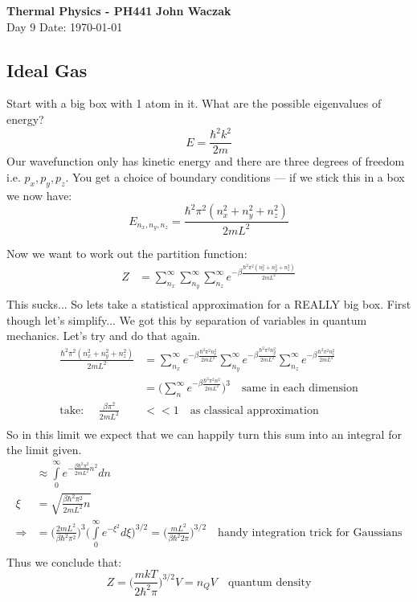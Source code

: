 \documentclass[a4paper, 11pt]{article}
\begin{document}
\noindent
\large\textbf{Thermal Physics - PH441} \hfill \textbf{John Waczak} \\
\normalsize Day 9 \hfill  Date: \today \\

\subsection*{Ideal Gas}
Start with a big box with 1 atom in it. What are the possible eigenvalues of energy? 
	\begin{equation*}
		E = \frac{\hbar^2k^2}{2m} 
	\end{equation*}
Our wavefunction only has kinetic energy and there are three degrees of freedom i.e. $p_x, p_y, p_z$. You get a choice of boundary conditions --- if we stick this in a box we now have: 
	\begin{equation*}
		E_{n_x, n_y,n_z} = \frac{\hbar^2\pi^2(n_x^2+n_y^2+n_z^2)}{2mL^2}
	\end{equation*}

\noindent Now we want to work out the partition function: 
	\begin{align*}
		Z &= \sum\limits_{n_x}^\infty \sum\limits_{n_y}^\infty \sum\limits_{n_z}^\infty e^{-\beta\frac{\hbar^2\pi^2(n_x^2+n_y^2+n_z^2)}{2mL^2}} \\ 
	\end{align*}
This sucks... So lets take a statistical approximation for a REALLY big box. First though let's simplify... We got this by separation of variables in quantum mechanics. Let's try and do that again. 
	\begin{align*}
		\frac{\hbar^2\pi^2(n_x^2+n_y^2+n_z^2)}{2mL^2} &= \sum\limits_{n_x}^\infty e^{-\beta \frac{\hbar^2\pi^2n_x^2}{2mL^2}}\sum\limits_{n_y}^\infty e^{-\beta \frac{\hbar^2\pi^2n_y^2}{2mL^2}}\sum\limits_{n_z}^\infty e^{-\beta \frac{\hbar^2\pi^2n_z^2}{2mL^2}} \\ 
		&= \Big(\sum\limits_n^\infty e^{-\beta\frac{\hbar^2\pi^2n^2}{2mL^2}}\Big)^3 \quad \text{same in each dimension} \\ 
		\text{take: } \quad \frac{\beta \pi^2}{2mL^2}&<< 1 \quad \text{as classical approximation} \\  
	\end{align*}
So in this limit we expect that we can happily turn this sum into an integral for the limit given. 
	\begin{align*}
		&\approx \int\limits_0^\infty e^{-\frac{\beta\hbar^2\pi^2}{2mL^2}n^2}dn  \\ 
		\xi &= \sqrt{\frac{\beta\hbar^2\pi^2}{2mL^2}n} \\ 
		\Rightarrow &= \Big(\frac{2mL^2}{\beta\hbar^2\pi^2} \Big)^3\Big(\int\limits_0^\infty e^{-\xi^2}d\xi\Big)^{3/2} = \Big(\frac{mL^2}{\beta\hbar^2 2 \pi} \Big)^{3/2}\quad \text{handy integration trick for Gaussians}\\ 
	\end{align*}
Thus we conclude that: 
	\begin{equation*}
		Z = \Big(\frac{mkT}{2\hbar^2\pi}\Big)^{3/2}V = n_Q V\quad \text{quantum density}
	\end{equation*}
	
\end{document}

